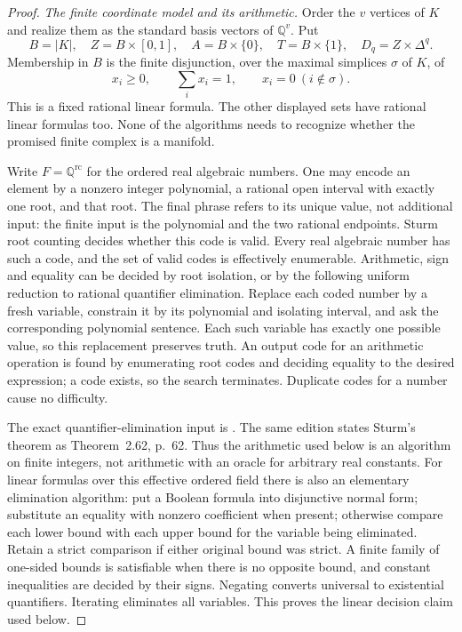\begin{proof}
\emph{The finite coordinate model and its arithmetic.}
Order the $v$ vertices of $K$ and realize them as the standard basis
vectors of $\mathbb Q^v$. Put
\[
 B=|K|,\quad Z=B\times[0,1],\quad A=B\times\{0\},\quad
 T=B\times\{1\},\quad D_q=Z\times\Delta^q.
\]
Membership in $B$ is the finite disjunction, over the maximal
simplices $\sigma$ of $K$, of
\[
 x_i\ge0,\qquad \sum_i x_i=1,\qquad x_i=0\ (i\notin\sigma).
\]
This is a fixed rational linear formula. The other displayed sets have
rational linear formulas too. None of the algorithms needs to
recognize whether the promised finite complex is a manifold.

Write $F=\mathbb Q^{\mathrm{rc}}$ for the ordered real algebraic
numbers. One may encode an element by a nonzero integer polynomial,
a rational open interval with exactly one root, and that root.
The final phrase refers to its unique value, not additional input:
the finite input is the polynomial and the two rational endpoints.
Sturm root counting decides whether this code is valid. Every real
algebraic number has such a code, and the set of valid codes is
effectively enumerable. Arithmetic, sign and equality can be decided
by root isolation, or by the following uniform reduction to rational
quantifier elimination. Replace each coded number by a fresh variable,
constrain it by its polynomial and isolating interval, and ask the
corresponding polynomial sentence. Each such variable has exactly one
possible value, so this replacement preserves truth. An output code
for an arithmetic operation is found by enumerating root codes and
deciding equality to the desired expression; a code exists, so the
search terminates. Duplicate codes for a number cause no difficulty.

The exact quantifier-elimination input is
\cite[online edition dated 26 June 2016, Theorem~2.94, p.~80;
Algorithm~14.16, pp.~586--587; Algorithm~14.21, pp.~591--592,
and Theorem~14.22, pp.~592--593]{BasuPollackRoy2016Online}.
The same edition states Sturm's theorem as Theorem~2.62, p.~62.
Thus the arithmetic used below is an algorithm on finite integers,
not arithmetic with an oracle for arbitrary real constants.
For linear formulas over this effective ordered field there is also
an elementary elimination algorithm: put a Boolean formula into
disjunctive normal form; substitute an equality with nonzero
coefficient when present; otherwise compare each lower bound with
each upper bound for the variable being eliminated. Retain a strict
comparison if either original bound was strict. A finite family of
one-sided bounds is satisfiable when there is no opposite bound,
and constant inequalities are decided by their signs. Negating
converts universal to existential quantifiers. Iterating eliminates
all variables. This proves the linear decision claim used below.


\end{proof}
